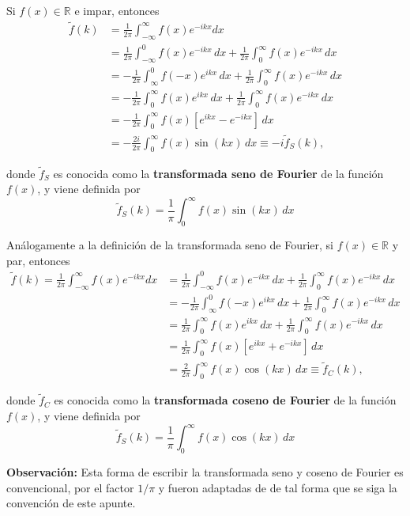 \begin{ejemplo}[Paridad]
Si $f(x) \in \mathbb{R}$ e impar, entonces
\begin{align*}
     \tilde{f}(k) &= \frac{1}{2\pi} \int_{-\infty}^{\infty} f(x) e^{-ikx} dx \\
&= \frac{1}{2\pi} \int_{-\infty}^0 f(x) e^{-ikx} \,dx + \frac{1}{2\pi} \int_{0}^{\infty} f(x) e^{-ikx} \, dx  \\
 &= -\frac{1}{2\pi} \int_{\infty}^0 f(-x) e^{ikx} \,dx + \frac{1}{2\pi} \int_{0}^{\infty} f(x) e^{-ikx} \, dx \\
     &= -\frac{1}{2\pi} \int_{0}^{\infty} f(x) e^{ikx} \,dx + \frac{1}{2\pi} \int_{0}^{\infty} f(x) e^{-ikx} \, dx  \\
      &= -\frac{1}{2\pi} \int_{0}^{\infty} f(x) [e^{ikx} - e^{-ikx}  ] \,dx \\
     &= -\frac{2i}{2\pi} \int_{0}^{\infty} f(x) \sin(kx) \,dx \equiv - i  \tilde{f}_S(k),
     \end{align*}
     
     donde $\tilde{f}_S$ es conocida como la \textbf{transformada seno de Fourier} de la función $f(x)$, y viene definida por 
     $$\boxed{\tilde{f}_S(k) = \frac{1}{\pi}  \int_{0}^{\infty} f(x) \sin(kx) \,dx}$$
     
Análogamente a la definición de la  transformada seno de Fourier, si $f(x) \in \mathbb{R}$ y par, entonces 
\begin{align*}
     \tilde{f}(k) = \frac{1}{2\pi} \int_{-\infty}^{\infty} f(x) e^{-ikx} dx &= \frac{1}{2\pi} \int_{-\infty}^0 f(x) e^{-ikx} \,dx + \frac{1}{2\pi} \int_{0}^{\infty} f(x) e^{-ikx} \, dx  \\
     &= -\frac{1}{2\pi} \int_{\infty}^0 f(-x) e^{ikx} \,dx + \frac{1}{2\pi} \int_{0}^{\infty} f(x) e^{-ikx} \, dx \\
     &= \frac{1}{2\pi} \int_{0}^{\infty} f(x) e^{ikx} \,dx + \frac{1}{2\pi} \int_{0}^{\infty} f(x) e^{-ikx} \, dx \\
     &= \frac{1}{2\pi} \int_{0}^{\infty} f(x) [e^{ikx} + e^{-ikx}  ] \,dx \\
     &= \frac{2}{2\pi} \int_{0}^{\infty} f(x) \cos(kx) \,dx \equiv  \tilde{f}_C(k),
     \end{align*}
     
donde $\tilde{f}_C$ es conocida como la \textbf{transformada coseno de Fourier} de la función $f(x)$, y viene definida por 
     $$\boxed{\tilde{f}_S(k) = \frac{1}{\pi}  \int_{0}^{\infty} f(x) \cos(kx) \,dx}$$

\textbf{Observación: } Esta forma de escribir la transformada seno y coseno de Fourier es convencional, por el factor $1/\pi$ y fueron adaptadas de \cite{Arfken} de tal forma que se siga la convención de este apunte.
\end{ejemplo}

